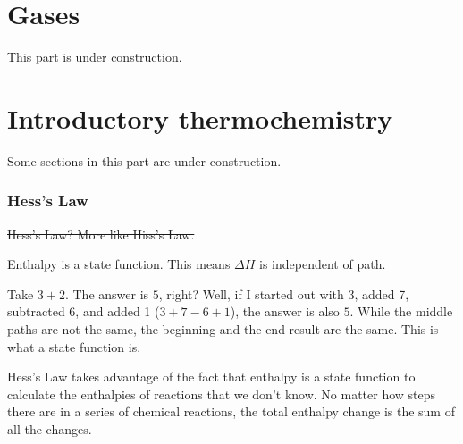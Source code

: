 \documentclass[letterpaper, 12pt]{article}
\begin{document}



\clearpage

\part{Gases}
This part is under construction.


\clearpage

\part{Introductory thermochemistry}

Some sections in this part are under construction.

\section{Hess's Law}
\st{Hess's Law? More like Hiss's Law.}

Enthalpy is a state function. This means $\Delta H$ is independent of path.

Take $3 + 2$. The answer is $5$, right? Well, if I started out with 3, added 7, subtracted 6, and added 1 ($3 + 7 - 6 + 1$), the answer is also $5$. While the middle paths are not the same, the beginning and the end result are the same. This is what a state function is.

Hess's Law takes advantage of the fact that enthalpy is a state function to calculate the enthalpies of reactions that we don't know. No matter how steps there are in a series of chemical reactions, the total enthalpy change is the sum of all the changes.
\end{document}
